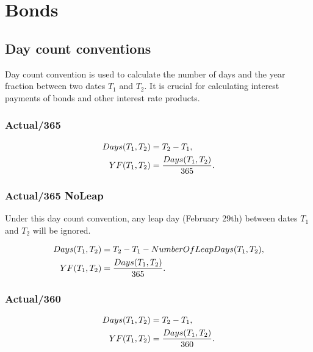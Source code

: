 \chapter{Bonds}

\section{Day count conventions}
Day count convention is used to calculate the number of days and the year 
fraction between two dates $T_1$ and $T_2$. It is crucial for calculating
interest payments of bonds and other interest rate products.

\subsection{Actual/365}

\begin{align}
  Days(T_1,T_2) &= T_2 - T_1, \notag \\
  YF(T_1,T_2) &= \frac{Days(T_1,T_2)}{365}.
\end{align}

\subsection{Actual/365 NoLeap}
Under this day count convention, any leap day (February 29th) between dates 
$T_1$ and $T_2$ will be ignored.

\begin{align}
  Days(T_1,T_2) &= T_2 - T_1 - NumberOfLeapDays(T_1,T_2), \notag \\
  YF(T_1,T_2) &= \frac{Days(T_1,T_2)}{365}.
\end{align}

\subsection{Actual/360}

\begin{align}
  Days(T_1,T_2) &= T_2 - T_1, \notag \\
  YF(T_1,T_2) &= \frac{Days(T_1,T_2)}{360}.
\end{align}

